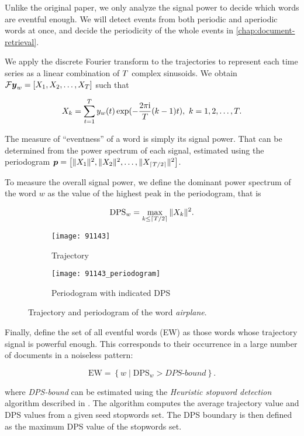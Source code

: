 Unlike the original paper, we only analyze the signal power to decide which words are eventful enough. We will detect events from both periodic and aperiodic words at once, and decide the periodicity of the whole events in \autoref{chap:document-retrieval}.

We apply the discrete Fourier transform to the trajectories to represent each time series as a linear combination of $T$ complex sinusoids. We obtain $\mathcal{F} \vect{\traj}_{w} = \left[ X_{1}, X_{2}, \dots, X_{\streamlen}\right ]$ such that

\begin{equation}
	X_{k} = \sum_{t = 1}^{T}{y_{w}(t) \exp(- \frac{2 \pi \mathrm{i}}{T} (k - 1) t}), ~ k = 1, 2, \dots, T.
\end{equation}

The measure of ``eventness'' of a word is simply its signal power. That can be determined from the power spectrum of each signal, estimated using the periodogram $\vect{P} = \left[ \|X_{1}\|^{2}, \|X_{2}\|^{2}, \dots, \|X_{\ceil{\streamlen / 2}}\|^{2} \right]$.

To measure the overall signal power, we define the dominant power spectrum of the word $w$ as the value of the highest peak in the periodogram, that is

\begin{equation}
	\text{DPS}_{w} = \max\limits_{k \leq \lceil T / 2\rceil}{\|X_{k}\|^{2}}.
\end{equation}


\begin{figure}
\centering
\begin{subfigure}{.5\textwidth}
  \centering
  \texttt{[image: 91143]}  %
  \caption{Trajectory}
  \label{fig:letadlo}
\end{subfigure}%
\begin{subfigure}{.5\textwidth}
  \centering
  \texttt{[image: 91143\_periodogram]}  %
  \caption{Periodogram with indicated DPS}
  \label{fig:letadlo-periodogram}
\end{subfigure}
\caption{Trajectory and periodogram of the word \textit{airplane}.}
\end{figure}

Finally, \cite{event-detection} define the set of all eventful words (EW) as those words whose trajectory signal is powerful enough. This corresponds to their occurrence in a large number of documents in a noiseless pattern:

\begin{equation}
	\text{EW} = \left\{ w \mid \text{DPS}_{w} > \textit{DPS-bound} \right\}.
\end{equation}

where \textit{DPS-bound} can be estimated using the \textit{Heuristic stopword detection} algorithm described in \cite{event-detection}. The algorithm computes the average trajectory value and DPS values from a given seed stopwords set. The DPS boundary is then defined as the maximum DPS value of the stopwords set.